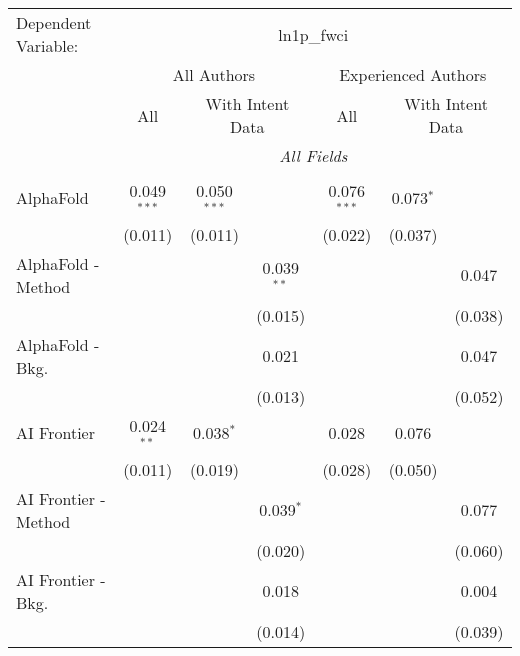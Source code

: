 \begingroup
\centering
\begin{tabular}{lcccccc}
   \tabularnewline \midrule \midrule
   Dependent Variable: & \multicolumn{6}{c}{ln1p\_fwci}\\
 & \multicolumn{3}{c}{All Authors} & \multicolumn{3}{c}{Experienced Authors} \\
\cmidrule(lr){2-4} \cmidrule(lr){5-7}
 & \multicolumn{1}{c}{All} & \multicolumn{2}{c}{With Intent Data} & \multicolumn{1}{c}{All} & \multicolumn{2}{c}{With Intent Data} \\
\cmidrule(lr){2-2} \cmidrule(lr){3-4} \cmidrule(lr){5-5} \cmidrule(lr){6-7}
 & \multicolumn{6}{c}{\textit{All Fields}} \\ \\
   AlphaFold            & 0.049$^{***}$ & 0.050$^{***}$ &               & 0.076$^{***}$ & 0.073$^{*}$ &   \\   
                        & (0.011)       & (0.011)       &               & (0.022)       & (0.037)     &   \\   
   AlphaFold - Method   &               &               & 0.039$^{**}$  &               &             & 0.047\\   
                        &               &               & (0.015)       &               &             & (0.038)\\   
   AlphaFold - Bkg.     &               &               & 0.021         &               &             & 0.047\\   
                        &               &               & (0.013)       &               &             & (0.052)\\   
   AI Frontier          & 0.024$^{**}$  & 0.038$^{*}$   &               & 0.028         & 0.076       &   \\   
                        & (0.011)       & (0.019)       &               & (0.028)       & (0.050)     &   \\   
   AI Frontier - Method &               &               & 0.039$^{*}$   &               &             & 0.077\\   
                        &               &               & (0.020)       &               &             & (0.060)\\   
   AI Frontier - Bkg.   &               &               & 0.018         &               &             & 0.004\\   
                        &               &               & (0.014)       &               &             & (0.039)\\   

\end{tabular}
